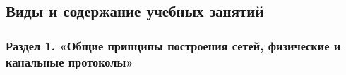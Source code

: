 \begin{center}
{%
}

\subsection{Виды и содержание учебных занятий}

\subsubsection{Раздел 1. «Общие принципы построения сетей, физические и канальные протоколы»}

{\parindent0pt

}
\end{center}
